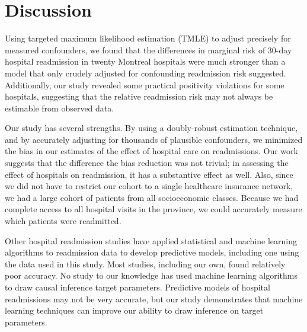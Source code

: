 \documentclass[]{article}\usepackage[]{graphicx}\usepackage[]{color}
\begin{document}
\section{Discussion}
Using targeted maximum likelihood estimation (TMLE) to adjust precisely for measured confounders, we found that the differences in marginal risk of 30-day hospital readmission in twenty Montreal hospitals were much stronger than a model that only crudely adjusted for confounding readmission risk suggested. Additionally, our study revealed some practical positivity violations for some hospitals, suggesting that the relative readmission risk may not always be estimable from observed data.

Our study has several strengths. By using a doubly-robust estimation technique, and by accurately adjusting for thousands of plausible confounders, we minimized the bias in our estimates of the effect of hospital care on readmissions. Our work suggests that the difference the bias reduction was not trivial; in assessing the effect of hospitals on readmission, it has a substantive effect as well. Also, since we did not have to restrict our cohort to a single healthcare insurance network, we had a large cohort of patients from all socioeconomic classes. Because we had complete access to all hospital visits in the province, we could accurately measure which patients were readmitted.

Other hospital readmission studies have applied statistical and machine learning algorithms to readmission data to develop predictive models\supercite{van_walraven_derivation_2010, he_mining_2014}, including one using the data used in this study.\supercite{hosseinzadeh_assessing_2013} Most studies, including our own, found relatively poor accuracy.  No study to our knowledge has used machine learning algorithms to draw causal inference target parameters. Predictive models of hospital readmissions may not be very accurate, but our study demonstrates that machine learning techniques can improve our ability to draw inference on target parameters.
\end{document}
